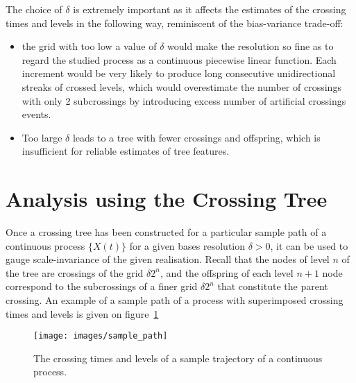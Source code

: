 The choice of $\delta$ is extremely important as it affects the estimates of the
crossing times and levels in the following way, reminiscent of the bias-variance
trade-off:
\begin{itemize}
    \item the grid with too low a value of $\delta$ would make the resolution so fine
    as to regard the studied process as a continuous piecewise linear function. Each
    increment would be very likely to produce long consecutive unidirectional streaks
    of crossed levels, which would overestimate the number of crossings with only 2
    subcrossings by introducing excess number of artificial crossings events.
    \item Too large $\delta$ leads to a tree with fewer crossings and offspring, which
    is insufficient for reliable estimates of tree features.
\end{itemize}


\section{Analysis using the Crossing Tree} %
\label{sec:analysis_using_the_crossing_tree}

Once a crossing tree has been constructed for a particular sample path of a continuous
process $\{X(t)\}$ for a given bases resolution $\delta>0$, it can be used to gauge
scale-invariance of the given realisation. Recall that the nodes of level $n$ of
the tree are crossings of the grid $\delta 2^n$, and the offspring of each level
$n+1$ node correspond to the subcrossings of a finer grid $\delta 2^n$ that constitute
the parent crossing. An example of a sample path of a process with superimposed
crossing times and levels is given on figure~\ref{fig:sample_path}
\begin{figure}[htb]\begin{center}
    \texttt{[image: images/sample\_path]}
    \caption{The crossing times and levels of a sample trajectory of a continuous process.}
\label{fig:sample_path}
\end{center}\end{figure}


